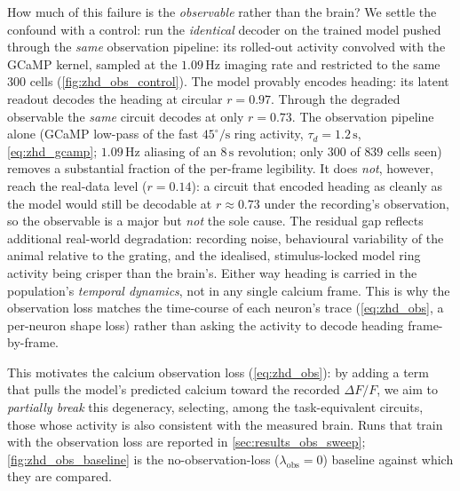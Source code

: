 \documentclass[11pt]{article}
\begin{document}
How much of this failure is the \emph{observable} rather than the brain? We
settle the confound with a control: run the \emph{identical} decoder on the
trained model pushed through the \emph{same} observation pipeline: its
rolled-out activity convolved with the GCaMP kernel, sampled at the
$1.09\,\mathrm{Hz}$ imaging rate and restricted to the same $300$ cells
(\cref{fig:zhd_obs_control}). The model provably encodes heading: its latent
readout decodes the heading at circular $r = 0.97$. Through the degraded
observable the \emph{same} circuit decodes at only $r = 0.73$. The
observation pipeline alone (GCaMP low-pass of the fast $45^\circ/\mathrm{s}$
ring activity, $\tau_d = 1.2\,\mathrm{s}$, \cref{eq:zhd_gcamp}; $1.09\,\mathrm{Hz}$
aliasing of an $8\,\mathrm{s}$ revolution; only $300$ of $839$ cells seen)
removes a substantial fraction of the per-frame legibility. It does
\emph{not}, however, reach the real-data level ($r = 0.14$): a circuit that
encoded heading as cleanly as the model would still be decodable at
$r \approx 0.73$ under the recording's observation, so the observable is a
major but \emph{not} the sole cause. The residual gap reflects additional
real-world degradation: recording noise, behavioural variability of the
animal relative to the grating, and the idealised, stimulus-locked model
ring activity being crisper than the brain's. Either way heading is carried in the
population's \emph{temporal dynamics}, not in any single calcium frame.
This is why the observation loss matches the time-course of each neuron's
trace (\cref{eq:zhd_obs}, a per-neuron shape loss) rather than asking the
activity to decode heading frame-by-frame.

This motivates the calcium observation loss (\cref{eq:zhd_obs}): by adding
a term that pulls the model's predicted calcium toward the recorded
$\Delta F/F$, we aim to \emph{partially break} this degeneracy,
selecting, among the task-equivalent circuits, those whose activity is
also consistent with the measured brain. Runs that train with the
observation loss are reported in \cref{sec:results_obs_sweep};
\cref{fig:zhd_obs_baseline} is the no-observation-loss
($\lambda_{\mathrm{obs}} = 0$) baseline against which they are compared.
\end{document}
